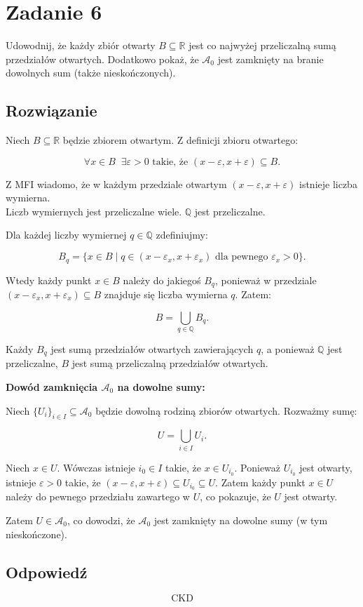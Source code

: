 \section{Zadanie 6}
Udowodnij, że każdy zbiór otwarty \(B \subseteq \mathbb{R}\) jest co najwyżej przeliczalną sumą przedziałów otwartych. Dodatkowo pokaż, że \(\mathcal{A}_0\) jest zamknięty na branie dowolnych sum (także nieskończonych).

\subsection*{Rozwiązanie}
Niech \(B \subseteq \mathbb{R}\) będzie zbiorem otwartym. Z definicji zbioru otwartego:

\[
	\forall x \in B \;\; \exists \varepsilon > 0 \text{ takie, że } (x-\varepsilon, x+\varepsilon) \subseteq B.
\]

Z MFI wiadomo, że w każdym przedziale otwartym \((x-\varepsilon, x+\varepsilon)\) istnieje liczba wymierna. \\
Liczb wymiernych jest przeliczalne wiele.
\(\mathbb{Q}\) jest przeliczalne.

Dla każdej liczby wymiernej \(q \in \mathbb{Q}\) zdefiniujmy:

\[
	B_q = \{ x \in B \mid q \in (x-\varepsilon_x, x+\varepsilon_x) \text{ dla pewnego } \varepsilon_x > 0 \}.
\]

Wtedy każdy punkt \(x \in B\) należy do jakiegoś \(B_q\), ponieważ w przedziale \((x-\varepsilon_x, x+\varepsilon_x) \subseteq B\) znajduje się liczba wymierna \(q\). Zatem:

\[
	B = \bigcup_{q \in \mathbb{Q}} B_q.
\]

Każdy \(B_q\) jest sumą przedziałów otwartych zawierających \(q\), a ponieważ \(\mathbb{Q}\) jest przeliczalne, \(B\) jest sumą przeliczalną przedziałów otwartych.

\medskip
\textbf{Dowód zamknięcia \(\mathcal{A}_0\) na dowolne sumy:}

Niech \(\{U_i\}_{i \in I} \subseteq \mathcal{A}_0\) będzie dowolną rodziną zbiorów otwartych.
Rozważmy sumę:

\[
	U = \bigcup_{i \in I} U_i.
\]

Niech \(x \in U\). Wówczas istnieje \(i_0 \in I\) takie, że \(x \in U_{i_0}\). Ponieważ \(U_{i_0}\) jest otwarty, istnieje \(\varepsilon > 0\) takie, że \((x-\varepsilon, x+\varepsilon) \subseteq U_{i_0} \subseteq U\). Zatem każdy punkt \(x \in U\) należy do pewnego przedziału zawartego w \(U\), co pokazuje, że \(U\) jest otwarty.

Zatem \(U \in \mathcal{A}_0\), co dowodzi, że \(\mathcal{A}_0\) jest zamknięty na dowolne sumy (w tym nieskończone).

\subsection*{Odpowiedź}
\[
	\boxed{\text{CKD}}
\]
